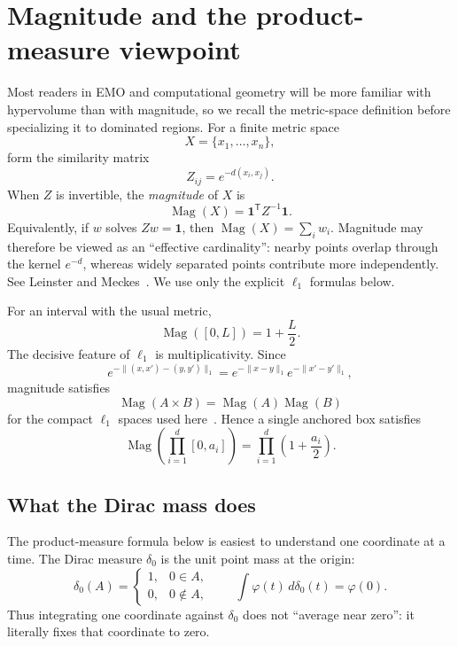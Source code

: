 \documentclass[12pt,a4paper]{article}
\theoremstyle{definition}
\newcommand{\Mag}{\operatorname{Mag}}
\newcommand{\1}{\mathbf 1}
\begin{document}
\section{Magnitude and the product-measure viewpoint}

Most readers in EMO and computational geometry will be more familiar with hypervolume than with magnitude, so we recall the metric-space definition before specializing it to dominated regions. For a finite metric space
\[
X=\{x_1,\ldots,x_n\},
\]
form the similarity matrix
\[
Z_{ij}=e^{-d(x_i,x_j)}.
\]
When $Z$ is invertible, the \emph{magnitude} of $X$ is
\begin{equation}
\Mag(X)=\mathbf 1^{\mathsf T}Z^{-1}\mathbf 1.                 \label{eq:finitemag}
\end{equation}
Equivalently, if $w$ solves $Zw=\mathbf 1$, then $\Mag(X)=\sum_iw_i$. Magnitude may therefore be viewed as an ``effective cardinality'': nearby points overlap through the kernel $e^{-d}$, whereas widely separated points contribute more independently. See Leinster and Meckes~\cite{LeinsterMeckes2017}. We use only the explicit $\ell_1$ formulas below.

For an interval with the usual metric,
\begin{equation}
\Mag([0,L])=1+\frac L2.                                      \label{eq:intervalmag}
\end{equation}
The decisive feature of $\ell_1$ is multiplicativity. Since
\[
e^{-\|(x,x')-(y,y')\|_1}=e^{-\|x-y\|_1}e^{-\|x'-y'\|_1},
\]
magnitude satisfies
\begin{equation}
\Mag(A\times B)=\Mag(A)\Mag(B)                              \label{eq:productmag}
\end{equation}
for the compact $\ell_1$ spaces used here~\cite{LeinsterMeckes2017}. Hence a single anchored box satisfies
\begin{equation}
\Mag\!\left(\prod_{i=1}^d[0,a_i]\right)
   =\prod_{i=1}^d\left(1+\frac{a_i}{2}\right).              \label{eq:boxmag}
\end{equation}

\subsection*{What the Dirac mass does}
The product-measure formula below is easiest to understand one coordinate at a time. The Dirac measure $\delta_0$ is the unit point mass at the origin:
\[
\delta_0(A)=\begin{cases}1,&0\in A,\\0,&0\notin A,\end{cases}
\qquad
\int \varphi(t)\,d\delta_0(t)=\varphi(0).
\]
Thus integrating one coordinate against $\delta_0$ does not ``average near zero'': it literally fixes that coordinate to zero.
\end{document}
